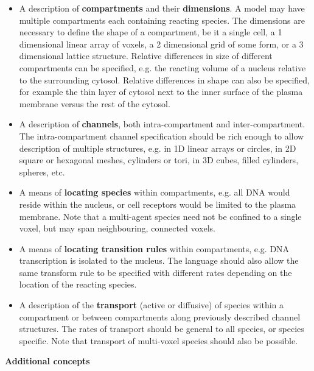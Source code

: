 \begin{itemize}
 \item A description of \textbf{compartments} and their \textbf{dimensions}. A model may have multiple compartments each containing reacting species. The dimensions are necessary to define the shape of a compartment, be it a single cell, a 1 dimensional linear array of voxels, a 2 dimensional grid of some form, or a 3 dimensional lattice structure. Relative differences in size of different compartments can be specified, e.g. the reacting volume of a nucleus relative to the surrounding cytosol. Relative differences in shape can also be specified, for example the thin layer of cytosol next to the inner surface of the plasma membrane versus the rest of the cytosol.

 \item A description of \textbf{channels}, both intra-compartment and inter-compartment. The intra-compartment channel specification should be rich enough to allow description of multiple structures, e.g. in 1D linear arrays or circles, in 2D square or hexagonal meshes, cylinders or tori, in 3D cubes, filled cylinders, spheres, etc.

 \item A means of \textbf{locating species} within compartments, e.g. all DNA would reside within the nucleus, or cell receptors would be limited to the plasma membrane. Note that a multi-agent species need not be confined to a single voxel, but may span neighbouring, connected voxels.

 \item A means of \textbf{locating transition rules} within compartments, e.g. DNA transcription is isolated to the nucleus. The language should also allow the same transform rule to be specified with different rates depending on the location of the reacting species.

 \item A description of the \textbf{transport} (active or diffusive) of species within a compartment or between compartments along previously described channel structures. The rates of transport should be general to all species, or species specific. Note that transport of multi-voxel species should also be possible.

\end{itemize}


\textbf{Additional concepts}

